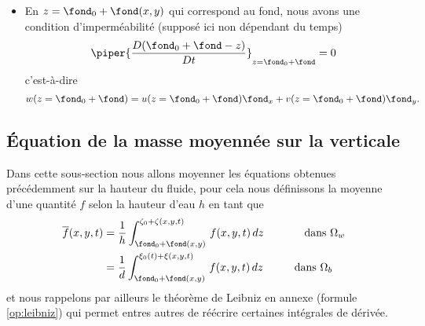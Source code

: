 \begin{itemize}[label=$\mybullet$]
	\item En $z = \fond_0 + \fond(x, y)$ qui correspond au fond, nous avons une condition d'imperméabilité (supposé ici non dépendant du temps)
	\begin{equation*}
	\piper{\frac{D (\fond_0+\fond - z)}{Dt}}_{z=\fond_0+\fond} = 0
	\end{equation*}
	c'est-à-dire
	\begin{equation}
	w(z = \fond_0 + \fond) = u(z=\fond_0+\fond)\fond_x + v(z=\fond_0+\fond)\fond_y.\label{eq:fondcondition}
	\end{equation}
\end{itemize}

\subsection{Équation de la masse moyennée sur la verticale}
\noindent Dans cette sous-section nous allons moyenner les équations obtenues précédemment sur la hauteur du fluide, pour cela nous définissons la moyenne d'une quantité $f$ selon la hauteur d'eau $h$ en tant que
\begin{align*}
  	\overline{f}(x, y, t) &= \frac{1}{h}\int_{\fond_0 + \fond(x, y)}^{\zeta_0+\zeta(x, y, t)}\,f(x, y, t)\,dz\hspace{1.3cm}\text{dans }\Omega_w\\
	&= \frac{1}{d}\int_{\fond_0 + \fond(x, y)}^{\xi_0(t)+\xi(x, y, t)}\,f(x, y, t)\,dz\hspace{1cm}\text{dans }\Omega_b
\end{align*}
et nous rappelons par ailleurs le théorème de Leibniz en annexe (formule \eqref{op:leibniz}) qui permet entres autres de réécrire certaines intégrales de dérivée.\\

